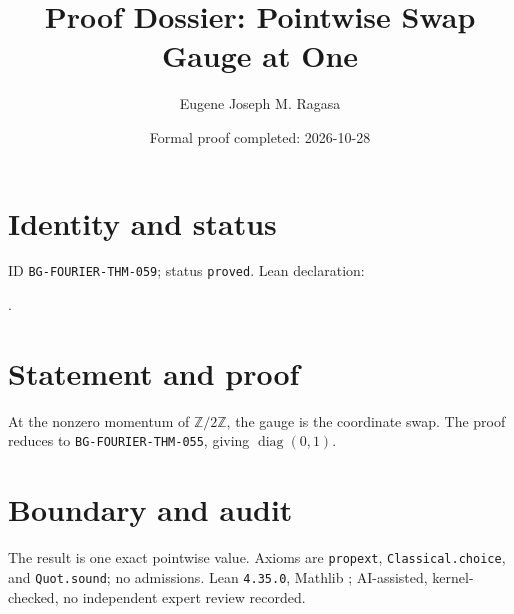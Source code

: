 \documentclass[11pt]{article}
\title{Proof Dossier: Pointwise Swap Gauge at One}\author{Eugene Joseph M. Ragasa}\date{Formal proof completed: 2026-10-28}
\begin{document}
\raggedright\maketitle
\section{Identity and status}
ID \texttt{BG-FOURIER-THM-059}; status \texttt{proved}. Lean declaration:
\par{}.
\section{Statement and proof}
At the nonzero momentum of $\mathbb Z/2\mathbb Z$, the gauge is the coordinate swap. The proof reduces to \texttt{BG-FOURIER-THM-055}, giving $\operatorname{diag}(0,1)$.
\section{Boundary and audit}
The result is one exact pointwise value. Axioms are \texttt{propext}, \texttt{Classical.choice}, and \texttt{Quot.sound}; no admissions. Lean \texttt{4.35.0}, Mathlib {\scriptsize{}}; AI-assisted, kernel-checked, no independent expert review recorded.
\end{document}

